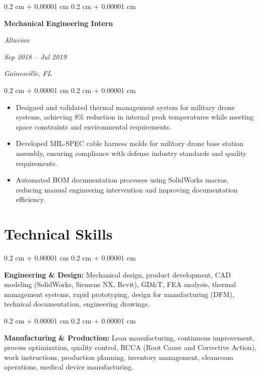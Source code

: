 \documentclass[10pt, letterpaper]{article}
\newenvironment{highlights}{
    \begin{itemize}[
        topsep=0.10 cm,
        parsep=0.10 cm,
        partopsep=0pt,
        itemsep=0pt,
        leftmargin=0.4 cm + 10pt
    ]
}{
    \end{itemize}
} %
\newenvironment{onecolentry}{
    \begin{adjustwidth}{
        0.2 cm + 0.00001 cm
    }{
        0.2 cm + 0.00001 cm
    }
}{
    \end{adjustwidth}
} %
\newenvironment{twocolentry}[2][]{
    \onecolentry
    \def\secondColumn{#2}
    \setcolumnwidth{\fill, 5.0 cm}
    \begin{paracol}{2}
}{
    \switchcolumn \raggedleft \secondColumn
    \end{paracol}
    \endonecolentry
} %
\begin{document}
        \vspace{0.35 cm}

        \begin{twocolentry}{
        \textit{Sep 2018 – Jul 2019}
        
        \textit{Gainesville, FL}}
            \textbf{Mechanical Engineering Intern}
            
            \textit{Altavian}
        \end{twocolentry}

        \vspace{0.10 cm}
        \begin{onecolentry}
            \begin{highlights}
                \item Designed and validated thermal management system for military drone systems, achieving 8\% reduction in internal peak temperatures while meeting space constraints and environmental requirements.
                \item Developed MIL-SPEC cable harness molds for military drone base station assembly, ensuring compliance with defense industry standards and quality requirements.
                \item Automated BOM documentation processes using SolidWorks macros, reducing manual engineering intervention and improving documentation efficiency.
            \end{highlights}
        \end{onecolentry}


\vspace{0.4 cm}


    
    \section{Technical Skills}

        \begin{onecolentry}
            \textbf{Engineering \& Design:} Mechanical design, product development, CAD modeling (SolidWorks, Siemens NX, Revit), GD\&T, FEA analysis, thermal management systems, rapid prototyping, design for manufacturing (DFM), technical documentation, engineering drawings.
        \end{onecolentry}

        \vspace{0.2 cm}

        \begin{onecolentry}
            \textbf{Manufacturing \& Production:} Lean manufacturing, continuous improvement, process optimization, quality control, RCCA (Root Cause and Corrective Action), work instructions, production planning, inventory management, cleanroom operations, medical device manufacturing.
        \end{onecolentry}
\end{document}
